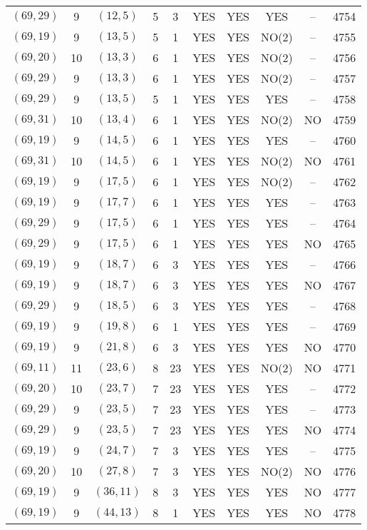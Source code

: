 \begin{longtable}{|c|c|c|c|c|c|c|c|c|c|}
$(69, 29)$ & 9 & $(12, 5)$ & 5 & 3 & YES & YES & YES & -- & 4754\\
$(69, 19)$ & 9 & $(13, 5)$ & 5 & 1 & YES & YES & NO(2) & -- & 4755\\
$(69, 20)$ & 10 & $(13, 3)$ & 6 & 1 & YES & YES & NO(2) & -- & 4756\\
$(69, 29)$ & 9 & $(13, 3)$ & 6 & 1 & YES & YES & NO(2) & -- & 4757\\
$(69, 29)$ & 9 & $(13, 5)$ & 5 & 1 & YES & YES & YES & -- & 4758\\
$(69, 31)$ & 10 & $(13, 4)$ & 6 & 1 & YES & YES & NO(2) & NO & 4759\\
$(69, 19)$ & 9 & $(14, 5)$ & 6 & 1 & YES & YES & YES & -- & 4760\\
$(69, 31)$ & 10 & $(14, 5)$ & 6 & 1 & YES & YES & NO(2) & NO & 4761\\
$(69, 19)$ & 9 & $(17, 5)$ & 6 & 1 & YES & YES & NO(2) & -- & 4762\\
$(69, 19)$ & 9 & $(17, 7)$ & 6 & 1 & YES & YES & YES & -- & 4763\\
$(69, 29)$ & 9 & $(17, 5)$ & 6 & 1 & YES & YES & YES & -- & 4764\\
$(69, 29)$ & 9 & $(17, 5)$ & 6 & 1 & YES & YES & YES & NO & 4765\\
$(69, 19)$ & 9 & $(18, 7)$ & 6 & 3 & YES & YES & YES & -- & 4766\\
$(69, 19)$ & 9 & $(18, 7)$ & 6 & 3 & YES & YES & YES & NO & 4767\\
$(69, 29)$ & 9 & $(18, 5)$ & 6 & 3 & YES & YES & YES & -- & 4768\\
$(69, 19)$ & 9 & $(19, 8)$ & 6 & 1 & YES & YES & YES & -- & 4769\\
$(69, 19)$ & 9 & $(21, 8)$ & 6 & 3 & YES & YES & YES & NO & 4770\\
$(69, 11)$ & 11 & $(23, 6)$ & 8 & 23 & YES & YES & NO(2) & NO & 4771\\
$(69, 20)$ & 10 & $(23, 7)$ & 7 & 23 & YES & YES & YES & -- & 4772\\
$(69, 29)$ & 9 & $(23, 5)$ & 7 & 23 & YES & YES & YES & -- & 4773\\
$(69, 29)$ & 9 & $(23, 5)$ & 7 & 23 & YES & YES & YES & NO & 4774\\
$(69, 19)$ & 9 & $(24, 7)$ & 7 & 3 & YES & YES & YES & -- & 4775\\
$(69, 20)$ & 10 & $(27, 8)$ & 7 & 3 & YES & YES & NO(2) & NO & 4776\\
$(69, 19)$ & 9 & $(36, 11)$ & 8 & 3 & YES & YES & YES & NO & 4777\\
$(69, 19)$ & 9 & $(44, 13)$ & 8 & 1 & YES & YES & YES & NO & 4778\\

\end{longtable}
